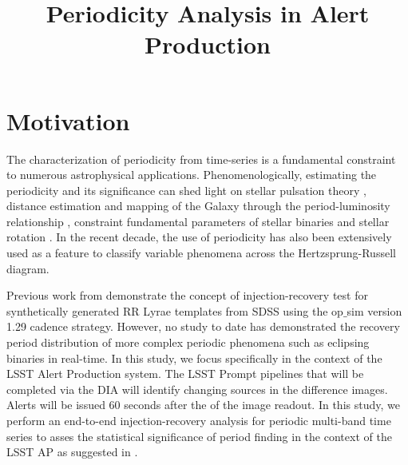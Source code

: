 \documentclass[DM,authoryear,toc]{lsstdoc}
\title{Periodicity Analysis in Alert Production}
\date{\vcsDate}
\begin{document}
\maketitle



\section{Motivation}
The characterization of periodicity from time-series is a fundamental constraint to numerous astrophysical applications.
Phenomenologically, estimating the periodicity and its significance can shed light on stellar pulsation theory \citep{Antonello:Antonello81}, distance estimation and mapping of the Galaxy through the period-luminosity relationship \citep{Skowron:Skowron2019}, constraint fundamental parameters of stellar binaries \citep{Farinella:Farinella1979} and stellar rotation \citep{Walkowicz:Walkowicz13}. In the recent decade, the use of periodicity has also been extensively used as a feature to classify variable phenomena \citep{Richards:R13} across the Hertzsprung-Russell diagram.

Previous work from \cite{2012AJ....144....9O} demonstrate the concept of injection-recovery test for synthetically generated RR Lyrae templates from SDSS using the op$\_$sim version 1.29 cadence strategy. However, no study to date has demonstrated the recovery period distribution of more complex periodic phenomena such as eclipsing binaries in real-time. In this study, we focus specifically in the context of the LSST Alert Production system. The LSST Prompt pipelines that will be completed via the DIA will identify changing sources in the difference images. Alerts will be issued 60 seconds after the of the image readout. In this study, we perform an end-to-end injection-recovery analysis for periodic multi-band time series to asses the statistical significance of period finding in the context of the LSST AP as suggested in .
\end{document}
